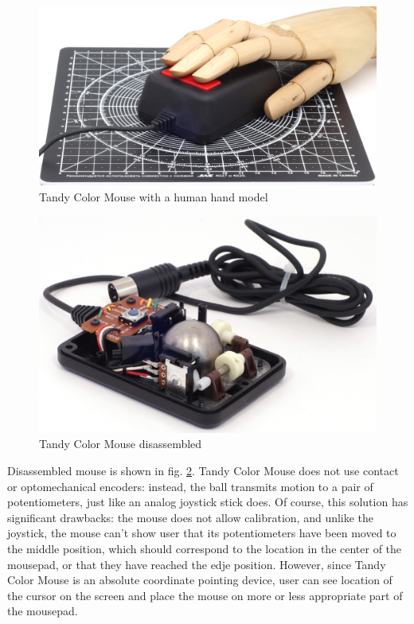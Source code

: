 \documentclass[11pt, a4paper]{article}
\begin{document}
\begin{figure}[h]
    \centering
    \includegraphics[scale=0.55]{1984_tandy_trs80_color_mouse/hand_30.jpg}
    \caption{Tandy Color Mouse with a human hand model}
    \label{fig:TandyColorMouseHand}
\end{figure}



\begin{figure}[h]
    \centering
    \includegraphics[scale=0.8]{1984_tandy_trs80_color_mouse/inside_30.jpg}
    \caption{Tandy Color Mouse disassembled}
    \label{fig:TandyColorMouseInside}
\end{figure}

Disassembled mouse is shown in fig. \ref{fig:TandyColorMouseInside}. Tandy Color Mouse does not use contact or optomechanical encoders: instead, the ball transmits motion to a pair of potentiometers, just like an analog joystick stick does. Of course, this solution has significant drawbacks: the mouse does not allow calibration, and unlike the joystick, the mouse can't show user that its potentiometers have been moved to the middle position, which should correspond to the location in the center of the mousepad, or that they have reached the edje position. However, since Tandy Color Mouse is an absolute coordinate pointing device, user can see location of the cursor on the screen and place the mouse on more or less appropriate part of the mousepad.
\end{document}
